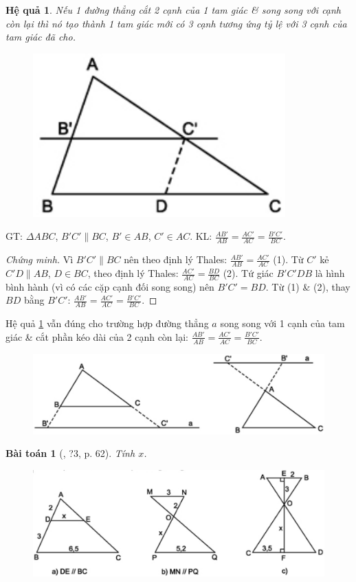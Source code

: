 \documentclass{article}
\newtheorem{baitoan}{Bài toán}
\newtheorem{hequa}{Hệ quả}
\begin{document}
\begin{hequa}
	\label{col: Thales}
	Nếu 1 đường thẳng cắt 2 cạnh của 1 tam giác \& song song với cạnh còn lại thì nó tạo thành 1 tam giác mới có 3 cạnh tương ứng tỷ lệ với 3 cạnh của tam giác đã cho.
\end{hequa}
\begin{figure}[H]
	\centering
	\includegraphics[scale=.25]{SGK_Toan_8_10}
\end{figure}
GT: $\Delta ABC$, $B'C'\parallel BC$, $B'\in AB$, $C'\in AC$. KL: $\frac{AB'}{AB} = \frac{AC'}{AC} = \frac{B'C'}{BC}$.

\begin{proof}[Chứng minh]
	Vì $B'C'\parallel BC$ nên theo định lý Thales: $\frac{AB'}{AB} = \frac{AC'}{AC}$ (1). Từ $C'$ kẻ $C'D\parallel AB$, $D\in BC$, theo định lý Thales: $\frac{AC'}{AC} = \frac{BD}{BC}$ (2). Tứ giác $B'C'DB$ là hình bình hành (vì có các cặp cạnh đối song song) nên $B'C' = BD$. Từ (1) \& (2), thay $BD$ bằng $B'C'$: $\frac{AB'}{AB} = \frac{AC'}{AC} = \frac{B'C'}{BC}$.
\end{proof}
Hệ quả \ref{col: Thales} vẫn đúng cho trường hợp đường thẳng $a$ song song với 1 cạnh của tam giác \& cắt phần kéo dài của 2 cạnh còn lại: $\frac{AB'}{AB} = \frac{AC'}{AC} = \frac{B'C'}{BC}$.
\begin{figure}[H]
	\centering
	\includegraphics[scale=.25]{SGK_Toan_8_11}
\end{figure}

\begin{baitoan}[\cite{SGK_Toan_8_tap_2}, ?3, p. 62]
	Tính $x$.
	\begin{figure}[H]
		\centering
		\includegraphics[scale=.25]{SGK_Toan_8_12}
	\end{figure}
\end{baitoan}
\end{document}
